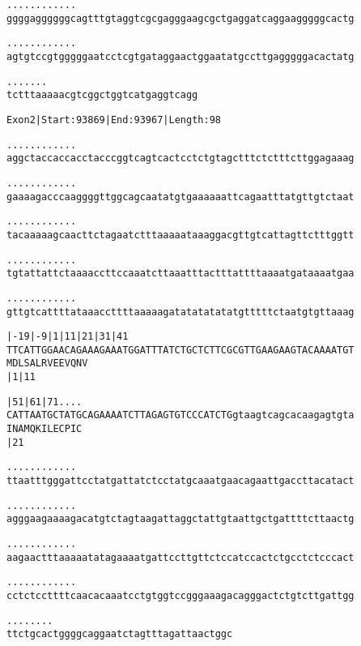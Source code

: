 \documentclass{article}
\begin{document}
\newpage
\begin{alltt}
  .    .    .    .    .    .    .    .    .    .    .    .  
ggggaggggggcagtttgtaggtcgcgagggaagcgctgaggatcaggaagggggcactg

  .    .    .    .    .    .    .    .    .    .    .    .  
agtgtccgtgggggaatcctcgtgataggaactggaatatgccttgagggggacactatg

  .    .    .    .    .    .    .
tctttaaaaacgtcggctggtcatgaggtcagg
\end{alltt}
\newpage
\begin{alltt}
Exon 2 | Start: 93869 | End: 93967 | Length: 98

.    .    .    .    .    .    .    .    .    .    .    .    
aggctaccaccacctacccggtcagtcactcctctgtagctttctctttcttggagaaag

.    .    .    .    .    .    .    .    .    .    .    .    
gaaaagacccaaggggttggcagcaatatgtgaaaaaattcagaatttatgttgtctaat

.    .    .    .    .    .    .    .    .    .    .    .    
tacaaaaagcaacttctagaatctttaaaaataaaggacgttgtcattagttctttggtt

.    .    .    .    .    .    .    .    .    .    .    .    
tgtattattctaaaaccttccaaatcttaaatttactttattttaaaatgataaaatgaa

.    .    .    .    .    .    .    .    .    .    .    .    
gttgtcattttataaaccttttaaaaagatatatatatatgtttttctaatgtgttaaag

|-19      |-9      |1        |11       |21       |31       |41
TTCATTGGAACAGAAAGAAATGGATTTATCTGCTCTTCGCGTTGAAGAAGTACAAAATGT
                   M  D  L  S  A  L  R  V  E  E  V  Q  N  V 
                   |1                            |11        

         |51       |61       |71           .    .    .    . 
CATTAATGCTATGCAGAAAATCTTAGAGTGTCCCATCTGgtaagtcagcacaagagtgta
 I  N  A  M  Q  K  I  L  E  C  P  I  C                      
                   |21                                      

   .    .    .    .    .    .    .    .    .    .    .    . 
ttaatttgggattcctatgattatctcctatgcaaatgaacagaattgaccttacatact

   .    .    .    .    .    .    .    .    .    .    .    . 
agggaagaaaagacatgtctagtaagattaggctattgtaattgctgattttcttaactg

   .    .    .    .    .    .    .    .    .    .    .    . 
aagaactttaaaaatatagaaaatgattccttgttctccatccactctgcctctcccact

   .    .    .    .    .    .    .    .    .    .    .    . 
cctctccttttcaacacaaatcctgtggtccgggaaagacagggactctgtcttgattgg

   .    .    .    .    .    .    .    .
ttctgcactggggcaggaatctagtttagattaactggc
\end{alltt}
\end{document}

